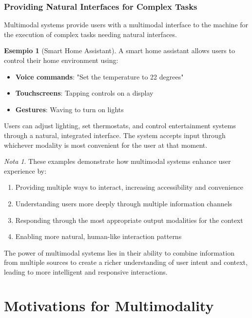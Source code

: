 \documentclass[11pt,a4paper]{article}
\theoremstyle{definition}
\newtheorem{example}{Esempio}[section]
\theoremstyle{plain}
\theoremstyle{remark}
\newtheorem*{remark}{Nota}
\begin{document}
\subsubsection{Providing Natural Interfaces for Complex Tasks}

Multimodal systems provide users with a multimodal interface to the machine for the execution of complex tasks needing natural interfaces.

\begin{example}[Smart Home Assistant]
A smart home assistant allows users to control their home environment using:
\begin{itemize}
    \item \textbf{Voice commands}: "Set the temperature to 22 degrees"
    \item \textbf{Touchscreens}: Tapping controls on a display
    \item \textbf{Gestures}: Waving to turn on lights
\end{itemize}

Users can adjust lighting, set thermostats, and control entertainment systems through a natural, integrated interface. The system accepts input through whichever modality is most convenient for the user at that moment.
\end{example}

\begin{remark}
These examples demonstrate how multimodal systems enhance user experience by:
\begin{enumerate}
    \item Providing multiple ways to interact, increasing accessibility and convenience
    \item Understanding users more deeply through multiple information channels
    \item Responding through the most appropriate output modalities for the context
    \item Enabling more natural, human-like interaction patterns
\end{enumerate}

The power of multimodal systems lies in their ability to combine information from multiple sources to create a richer understanding of user intent and context, leading to more intelligent and responsive interactions.
\end{remark}

\section{Motivations for Multimodality}
\end{document}
